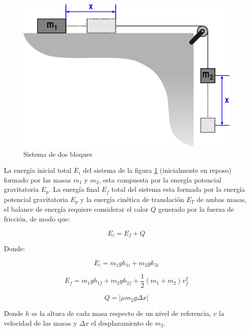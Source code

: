 \documentclass[letter,11pt]{article}
\begin{document}
\begin{figure}[!h]
\centering
\includegraphics[scale=0.60]{resources/figura1.eps}
\caption{Sistema de dos bloques}
\label{figura1}
\end{figure}

La energía inicial total $E_i$ del sistema de la figura \ref{figura1}
(inicialmente en reposo) formado por las masas $m_1$ y $m_2$, esta compuesta por
la energía potencial gravitatoria $E_p$. La energía final $E_f$ total del
sistema esta formada por la energía potencial gravitatoria $E_p$ y la energía
cinética de translación $E_T$ de ambas masas, el balance de energía requiere
considerar el calor $Q$ generado por la fuerza de fricción, de modo que:

\begin{equation*}
    E_i = E_f + Q
\end{equation*}

Donde:

\begin{equation*}
    E_i = m_1 g h_{1i} + m_2 g h_{2i}
\end{equation*}

\begin{equation*}
    E_f = m_1 g h_{1f} + m_2 g h_{2f} + \frac{1}{2} ( m_1 + m_2 ) v_f^2
\end{equation*}

\begin{equation*}
    Q = | \mu m_2 g \Delta x |
\end{equation*}

Donde $h$ es la altura de cada masa respecto de un nivel de referencia, $v$ la
velocidad de las masas y $\Delta x$ el desplazamiento de $m_2$.
\end{document}
